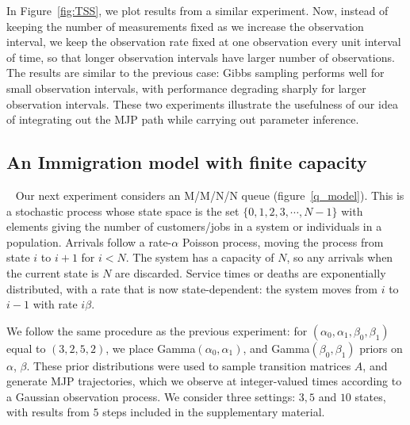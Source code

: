 In Figure~\ref{fig:TSS}, we plot results from a similar experiment. Now,
instead of keeping the number of measurements fixed as we increase the observation
interval, we keep the observation rate fixed at one observation every unit
interval of time, so that longer observation intervals have larger number of 
observations. The results are similar to the previous case: Gibbs sampling
performs well for small observation intervals, with performance degrading
sharply for larger observation intervals. These two experiments illustrate the 
usefulness of our idea of integrating out the MJP path while carrying out
parameter inference.

\subsection{An Immigration model with finite capacity}\label{sec:immig}~
 Our next experiment considers an M/M/N/N queue (figure~\ref{q_model}). This is a stochastic process 
whose state space is the set $\{0, 1, 2, 3, \cdots, N - 1\}$ with elements
giving the number of customers/jobs in a system or individuals in a population. 
Arrivals follow a rate-$\alpha$ Poisson process, moving the process from state 
$i$ to $i+1$ for $i<N$. The system has a capacity of $N$, so any arrivals when 
the current state is $N$ are discarded.  Service times or deaths are 
exponentially distributed, with a rate that is now state-dependent:
the system moves from $i$ to $i - 1$ with rate $i\beta$. 

We follow the same procedure as the previous experiment:
for $(\alpha_0,\alpha_1,\beta_0,\beta_1)$ equal to $(3,2,5,2)$,
we place Gamma$(\alpha_0,\alpha_1)$, and Gamma$(\beta_0, \beta_1)$ priors on 
$\alpha$, $\beta$. These prior distributions were used to sample transition 
matrices $A$, and generate MJP trajectories, which we observe at integer-valued
times according to a Gaussian observation process.
We consider three settings: $3, 5$ and $10$ states, with results from $5$ 
steps included in the supplementary material. 

